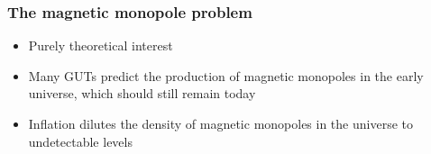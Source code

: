 \documentclass[]{beamer}
\begin{document}
\begin{frame}
  \frametitle{The magnetic monopole problem}
  \begin{itemize}
  \item Purely theoretical interest

  \item Many GUTs predict the production of magnetic monopoles in the
    early universe, which should still remain today

  \item Inflation dilutes the density of magnetic monopoles in the
    universe to undetectable levels

  \end{itemize}
\end{frame}


\end{document}
